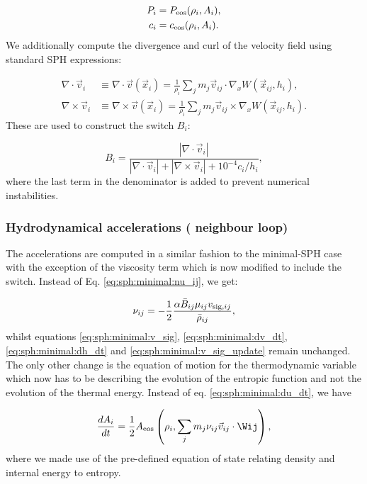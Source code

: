 \begin{align}
  P_i &= P_{\rm eos}(\rho_i, A_i),   \label{eq:sph:gadget2:P}\\
  c_i &= c_{\rm eos}(\rho_i, A_i).   \label{eq:sph:gadget2:c}
\end{align}
We additionally compute the divergence and curl of the velocity field using
standard SPH expressions:

\begin{align}
  \nabla\cdot\vec{v}_i &\equiv\nabla\cdot \vec{v}(\vec{x}_i) = \frac{1}{\rho_i}
\sum_j m_j
  \vec{v}_{ij}\cdot\nabla_x W(\vec{x}_{ij}, h_i)
\label{eq:sph:gadget2:div_v},\\ 
    \nabla\times\vec{v}_i &\equiv \nabla\times \vec{v}(\vec{x}_i) =
\frac{1}{\rho_i} \sum_j m_j
  \vec{v}_{ij}\times\nabla_x W(\vec{x}_{ij}, h_i) \label{eq:sph:gadget2:rot_v}.
\end{align}
These are used to construct the \cite{Balsara1995} switch $B_i$:

\begin{equation}
  B_i = \frac{|\nabla\cdot\vec{v}_i|}{|\nabla\cdot\vec{v}_i| +
    |\nabla\times\vec{v}_i| + 10^{-4}c_i / h_i}, \label{eq:sph:gadget2:balsara}
\end{equation}
where the last term in the denominator is added to prevent numerical
instabilities.

\subsubsection{Hydrodynamical accelerations ( neighbour loop)}

The accelerations are computed in a similar fashion to the minimal-SPH
case with the exception of the viscosity term which is now modified to
include the switch. Instead of Eq. \ref{eq:sph:minimal:nu_ij}, we get:

\begin{equation}
\nu_{ij} = -\frac{1}{2}\frac{\alpha \bar B_{ij} \mu_{ij} v_{{\rm
sig},ij}}{\bar\rho_{ij}},
  \label{eq:sph:gadget2:nu_ij}  
\end{equation}
whilst equations \ref{eq:sph:minimal:v_sig},
\ref{eq:sph:minimal:dv_dt}, \ref{eq:sph:minimal:dh_dt} and
\ref{eq:sph:minimal:v_sig_update} remain unchanged. The only other
change is the equation of motion for the thermodynamic variable which
now has to be describing the evolution of the entropic function and
not the evolution of the thermal energy. Instead of eq.
\ref{eq:sph:minimal:du_dt}, we have

\begin{equation}
\frac{dA_i}{dt} = \frac{1}{2} A_{\rm eos}\left(\rho_i, \sum_j
m_j \nu_{ij}\vec{v}_{ij}\cdot \Wij\right),
\end{equation}
where we made use of the pre-defined equation of state relating
density and internal energy to entropy.

